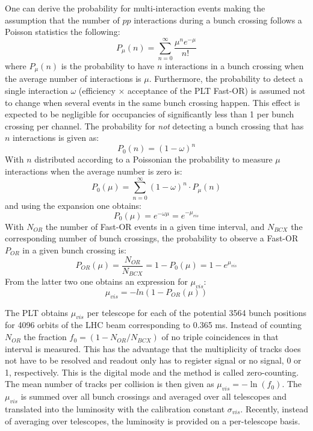 One can derive the probability for multi-interaction events making the assumption that
the number of $pp$ interactions during a bunch crossing follows a Poisson statistics the following:
\begin{equation}
P_{\mu}(n) = \sum_{n=0}^{\infty} \frac{\mu^n e^{-\mu}}{n!}
\end{equation}
where $P_\mu(n)$ is the probability to have $n$ interactions in a bunch crossing when the average
number of interactions is $\mu$. Furthermore, the probability to detect a single interaction $\omega$
(efficiency $\times$ acceptance of the PLT Fast-OR) is assumed not to change when several events in the same
bunch crossing happen. This effect is expected to be negligible for occupancies of significantly less than 1 per
bunch crossing per channel. The probability for {\em not} detecting a bunch crossing
that has $n$ interactions is given as:
\begin{equation}
P_0(n) = (1 - \omega)^n
\end{equation}
With $n$ distributed according to a Poissonian the probability to measure $\mu$ interactions
when the average number is zero is:
\begin{equation}
P_0(\mu) = \sum_{n=0}^{\infty} (1 - \omega)^n \cdot P_{\mu}(n)
\end{equation}
and using the expansion one obtains:
\begin{equation}
P_0(\mu) = e^{-\omega \mu} = e^{-\mu_{vis}}
\end{equation}
With $N_{OR}$ the number of Fast-OR events in a given time interval, and $N_{BCX}$ the
corresponding number of bunch crossings, the probability to observe a Fast-OR $P_{OR}$
in a given bunch crossing is:
\begin{equation}
P_{OR}(\mu) = \frac{N_{OR}}{N_{BCX}} = 1 - P_0(\mu) = 1 - e^{\mu_{vis}}
\end{equation}
From the latter two one obtains an expression for $\mu_{vis}$:
\begin{equation}
\mu_{vis} = - ln(1 - P_{OR}(\mu))
\end{equation}

The PLT obtains $\mu_{vis}$ per telescope for each of the potential 3564 bunch positions
for 4096 orbits of the LHC beam corresponding to 0.365 ms.
Instead of counting $N_{OR}$ the fraction $f_0 = (1 - N_{OR}/N_{BCX})$ of no triple coincidences
in that interval is measured. This has the advantage that the multiplicity of tracks does not have
to be resolved and readout only has to register signal or no signal, 0 or 1, respectively.
This is the digital mode and the method is called zero-counting. The mean number of tracks per collision
is then given as $\mu_{vis} = -\ln ( f_0 )$.
The $\mu_{vis}$ is summed over all bunch crossings and averaged over all telescopes
and translated into the luminosity with the calibration constant $\sigma_{vis}$.
Recently, instead of averaging over telescopes, the luminosity is provided on a per-telescope basis.
